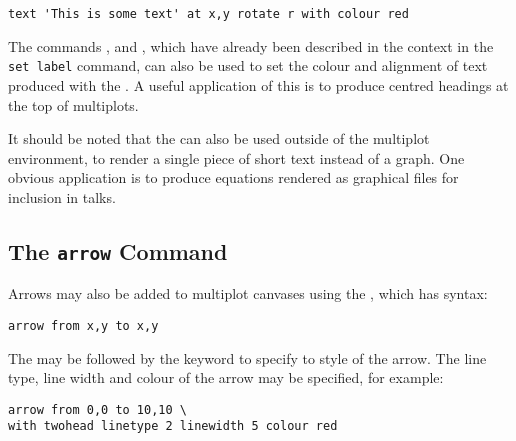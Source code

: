 \begin{verbatim}
text 'This is some text' at x,y rotate r with colour red
\end{verbatim}

The commands ,  and
, which have already been described in the context in
the {\tt set label} command, can also be used to set the colour and alignment
of text produced with the .  A useful application of this is to
produce centred headings at the top of multiplots.

It should be noted that the  can also be used outside of the
multiplot environment, to render a single piece of short text instead of a
graph. One obvious application is to produce equations rendered as graphical
files for inclusion in talks.

\subsection{The {\tt arrow} Command}

Arrows may also be added to multiplot canvases using the , which
has syntax:

\begin{verbatim}
arrow from x,y to x,y
\end{verbatim}

The  may be followed by the  keyword to specify to
style of the arrow. The line type, line width and colour of the arrow may be
specified, for example:

\begin{verbatim}
arrow from 0,0 to 10,10 \
with twohead linetype 2 linewidth 5 colour red
\end{verbatim}

